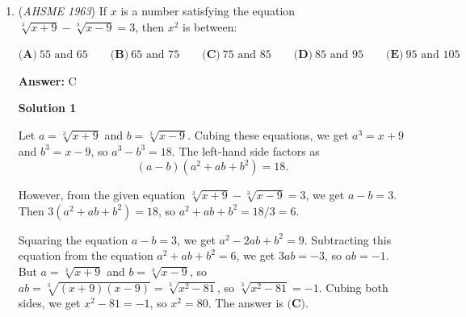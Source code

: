 \begin{enumerate}
 



\textbf{Solution 3 (Menelaus’s Theorem)}

By using Menelaus’s Theorem on triangle BCE and points A, P, D, we can substitute in the known values to find that the answer is 5:
 \[\frac{CP}{PE} \cdot \frac{EA}{AB} \cdot \frac{BD}{DC} = 1\]
 \[\frac{CP}{PE} \cdot \frac{3}{5} \cdot \frac{1}{3} = 1\]
 \[\frac{CP}{PE} = 5\]-pengu14

 



\textbf{Solution 4 (Ceva and Menelaus)}

Draw $BP$ to intersect line $CA$ at $X$. Then, through Ceva's on $ABC$,

 
 \[\frac{CX}{XA} \cdot \frac{AE}{EB} \cdot \frac{BD}{DC} = 1\]
 \[\frac{CX}{XA} \cdot \frac{3}{2} \cdot \frac{1}{3} = 1\]
 \[\frac{CX}{XA} = 2\].

 Then, through Menelaus' on $CAE$,

 
 \[\frac{CX}{XA} \cdot \frac{AB}{BE} \cdot \frac{EP}{PC} = 1\]
 \[2 \cdot \frac{5}{2} \cdot \frac{EP}{PC} = 1\]
 \[\frac{EP}{PC} = \frac{1}{5}\]

 Thus $\frac{PC}{EP} = \boxed{5}$



	\item (\textit{AHSME 1963}) If $x$ is a number satisfying the equation $\sqrt[3]{x+9}-\sqrt[3]{x-9}=3$, then $x^2$ is between:


 $\textbf{(A)}\ 55\text{ and }65\qquad \textbf{(B)}\ 65\text{ and }75\qquad \textbf{(C)}\ 75\text{ and }85\qquad \textbf{(D)}\ 85\text{ and }95\qquad \textbf{(E)}\ 95\text{ and }105$

 \textbf{Answer: }C



\textbf{Solution 1}

Let $a = \sqrt[3]{x + 9}$ and $b = \sqrt[3]{x - 9}$. Cubing these equations, we get $a^3 = x + 9$ and $b^3 = x - 9$, so $a^3 - b^3 = 18$. The left-hand side factors as
 \[(a - b)(a^2 + ab + b^2) = 18.\]

 However, from the given equation $\sqrt[3]{x + 9} - \sqrt[3]{x - 9} = 3$, we get $a - b = 3$. Then $3(a^2 + ab + b^2) = 18$, so $a^2 + ab + b^2 = 18/3 = 6$.

 Squaring the equation $a - b = 3$, we get $a^2 - 2ab + b^2 = 9$. Subtracting this equation from the equation $a^2 + ab + b^2 = 6$, we get $3ab = -3$, so $ab = -1$. But $a = \sqrt[3]{x + 9}$ and $b = \sqrt[3]{x - 9}$, so $ab = \sqrt[3]{(x + 9)(x - 9)} = \sqrt[3]{x^2 - 81}$, so $\sqrt[3]{x^2 - 81} = -1$. Cubing both sides, we get $x^2 - 81 = -1$, so $x^2 = 80$. The answer is $\boxed{\textbf{(C)}}$.


\end{enumerate}

